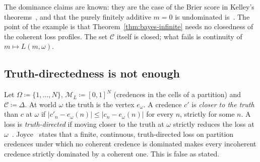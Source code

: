 \documentclass[11pt]{article}
\theoremstyle{definition}
\theoremstyle{remark}
\newcommand{\M}{\mathcal M}
\newcommand{\C}{\mathcal C}
\begin{document}
The dominance claims are known: they are the case of the Brier score in Kelley's theorems~\cite[Theorems~3.4 and~4.26]{Kelley}, and that the purely finitely additive $m=0$ is undominated is~\cite[Example~3]{SSK14}. The point of the example is that Theorem~\ref{thm:bayes-infinite} needs no closedness of the coherent loss profiles. The set $\C$ itself is closed; what fails is continuity of $m\mapsto L(m,\omega)$.

\subsection{Truth-directedness is not enough}\label{sec:joyce}
Let $\Omega\coloneqq\{1,\dots,N\}$, $\M_L\coloneqq[0,1]^N$ (credences in the cells of a partition) and $\C\coloneqq\Delta$. At world $\omega$ the truth is the vertex $e_\omega$. A credence $c'$ is \emph{closer to the truth} than $c$ at $\omega$ if $|c'_n-e_\omega(n)|\le|c_n-e_\omega(n)|$ for every $n$, strictly for some $n$. A loss is \emph{truth-directed} if moving closer to the truth at $\omega$ strictly reduces the loss at $\omega$~\cite[p.~269]{Joyce}. Joyce~\cite[Theorem~2, pp.~287--288]{Joyce} states that a finite, continuous, truth-directed loss on partition credences under which no coherent credence is dominated makes every incoherent credence strictly dominated by a coherent one. This is false as stated.
\end{document}
